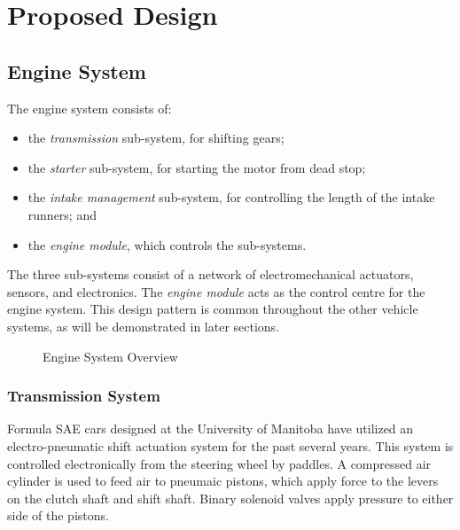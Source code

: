 %
%
%
%

\chapter{Proposed Design}

%
%

\section{Engine System}

The engine system consists of:

\begin{itemize}
\item the \emph{transmission} sub-system, for shifting gears;
\item the \emph{starter} sub-system, for starting the motor from dead stop; 
\item the \emph{intake management} sub-system, for controlling the length of the intake runners; and
\item the \emph{engine module}, which controls the sub-systems.
\end{itemize}

The three sub-systems consist of a network of electromechanical actuators, sensors, and electronics. The \emph{engine module} acts as the control centre for the engine system. This design pattern is common throughout the other vehicle systems, as will be demonstrated in later sections.

\begin{figure}[H]
	\centering
		
	\caption{Engine System Overview\label{fig:engine_system_overview}}
\end{figure}

\subsection{Transmission System}

Formula SAE cars designed at the University of Manitoba have utilized an electro-pneumatic shift actuation system for the past several years. This system is controlled electronically from the steering wheel by paddles. A compressed air cylinder is used to feed air to pneumaic pistons, which apply force to the levers on the clutch shaft and shift shaft. Binary solenoid valves apply pressure to either side of the pistons. 

